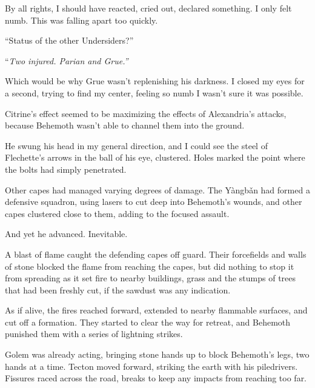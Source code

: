 By all rights, I should have reacted, cried out, declared something.  I only felt numb.  This was falling apart too quickly.



``Status of the other Undersiders?''



``\emph{Two injured.  Parian and Grue.''}



Which would be why Grue wasn't replenishing his darkness.  I closed my eyes for a second, trying to find my center, feeling so numb I wasn't sure it was possible.



Citrine's effect seemed to be maximizing the effects of Alexandria's attacks, because Behemoth wasn't able to channel them into the ground.



He swung his head in my general direction, and I could see the steel of Flechette's arrows in the ball of his eye, clustered.  Holes marked the point where the bolts had simply penetrated.



Other capes had managed varying degrees of damage.  The Y\`{a}ngb\v{a}n had formed a defensive squadron, using lasers to cut deep into Behemoth's wounds, and other capes clustered close to them, adding to the focused assault.



And yet he advanced.  Inevitable.



A blast of flame caught the defending capes off guard.  Their forcefields and walls of stone blocked the flame from reaching the capes, but did nothing to stop it from spreading as it set fire to nearby buildings, grass and the stumps of trees that had been freshly cut, if the sawdust was any indication.



As if alive, the fires reached forward, extended to nearby flammable surfaces, and cut off a formation.  They started to clear the way for retreat, and Behemoth punished them with a series of lightning strikes.



Golem was already acting, bringing stone hands up to block Behemoth's legs, two hands at a time.  Tecton moved forward, striking the earth with his piledrivers.  Fissures raced across the road, breaks to keep any impacts from reaching too far.



